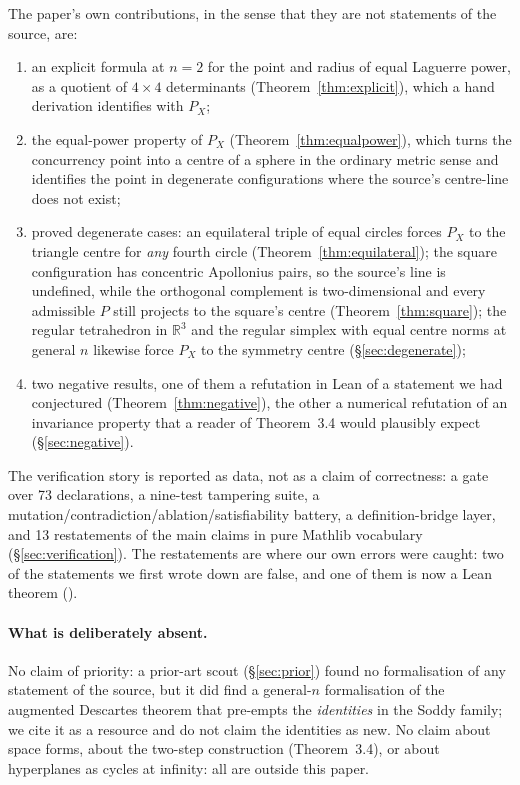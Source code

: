 \documentclass[11pt]{article}
\theoremstyle{definition}
\theoremstyle{remark}
\newcommand{\RR}{\mathbb{R}}
\begin{document}
The paper's own contributions, in the sense that they are not statements of the source, are:
\begin{enumerate}
\item an explicit formula at $n=2$ for the point and radius of equal Laguerre power, as a quotient of
$4\times4$ determinants (Theorem~\ref{thm:explicit}), which a hand derivation identifies with
$P_X$;
\item the equal-power property of $P_X$ (Theorem~\ref{thm:equalpower}), which turns the
concurrency point into a centre of a sphere in the ordinary metric sense and identifies the point in
degenerate configurations where the source's centre-line does not exist;
\item proved degenerate cases: an equilateral triple of equal circles forces $P_X$ to the triangle
centre for \emph{any} fourth circle (Theorem~\ref{thm:equilateral}); the square configuration has
concentric Apollonius pairs, so the source's line is undefined, while the orthogonal complement is
two-dimensional and every admissible $P$ still projects to the square's centre
(Theorem~\ref{thm:square}); the regular tetrahedron in $\RR^3$ and the regular simplex with equal
centre norms at general $n$ likewise force $P_X$ to the symmetry centre
(\S\ref{sec:degenerate});
\item two negative results, one of them a refutation in Lean of a statement we had conjectured
(Theorem~\ref{thm:negative}), the other a numerical refutation of an invariance property that a
reader of Theorem~3.4 would plausibly expect (\S\ref{sec:negative}).
\end{enumerate}

The verification story is reported as data, not as a claim of correctness: a gate over 73
declarations, a nine-test tampering suite, a mutation/contradiction/ablation/satisfiability battery,
a definition-bridge layer, and 13 restatements of the main claims in pure Mathlib vocabulary
(\S\ref{sec:verification}). The restatements are where our own errors were caught: two of the
statements we first wrote down are false, and one of them is now a Lean theorem
().

\paragraph{What is deliberately absent.} No claim of priority: a prior-art scout
(\S\ref{sec:prior}) found no formalisation of any statement of the source, but it did find a
general-$n$ formalisation of the augmented Descartes theorem that pre-empts the \emph{identities} in
the Soddy family; we cite it as a resource and do not claim the identities as new. No claim about
space forms, about the two-step construction (Theorem~3.4), or about hyperplanes as cycles at
infinity: all are outside this paper.
\end{document}
